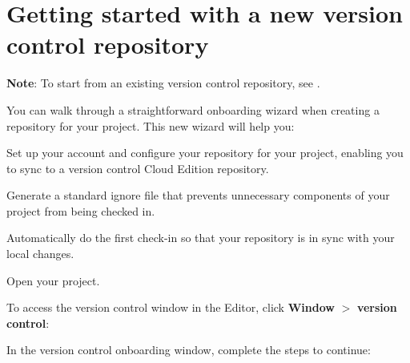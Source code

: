 \chapter{Getting started with a new version control repository}
\hypertarget{md__hey_tea_9_2_library_2_package_cache_2com_8unity_8collab-proxy_0d2_80_85_2_documentation_0i_2_new_repo}{}\label{md__hey_tea_9_2_library_2_package_cache_2com_8unity_8collab-proxy_0d2_80_85_2_documentation_0i_2_new_repo}
\label{md__hey_tea_9_2_library_2_package_cache_2com_8unity_8collab-proxy_0d2_80_85_2_documentation_0i_2_new_repo_autotoc_md888}%
%
 {\bfseries{Note}}\+: To start from an existing version control repository, see .

You can walk through a straightforward onboarding wizard when creating a repository for your  project. This new wizard will help you\+:


\begin{DoxyItemize}
\item Set up your account and configure your repository for your  project, enabling you to sync to a version control Cloud Edition repository.
\item Generate a standard ignore file that prevents unnecessary components of your  project from being checked in.
\item Automatically do the first check-\/in so that your repository is in sync with your local changes.
\end{DoxyItemize}
\begin{DoxyEnumerate}
\item Open your  project.
\item To access the version control window in the  Editor, click {\bfseries{Window}} \texorpdfstring{$>$}{>} {\bfseries{version control}}\+: 
\item In the version control onboarding window, complete the steps to continue\+: 
\end{DoxyEnumerate}

